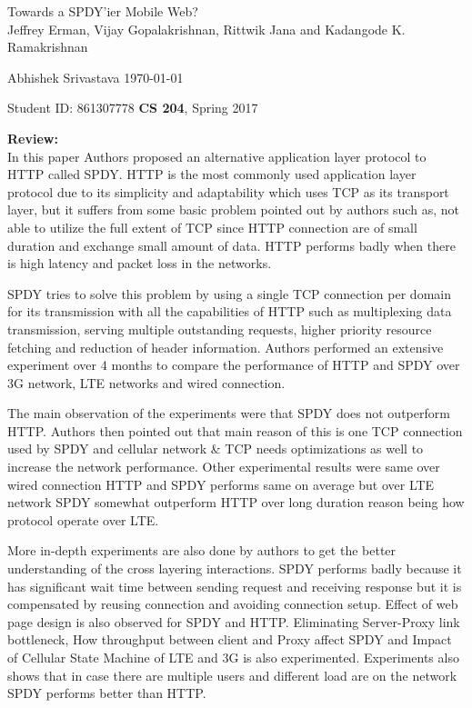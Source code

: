 \documentclass[a4paper,12pt, twoside]{article}
\renewcommand{\maketitle}{%
 	\Large
 	\begin{center}
 	Towards a SPDY'ier Mobile Web?\\	
 	\normalsize Jeffrey Erman, Vijay Gopalakrishnan,  Rittwik Jana and Kadangode K. Ramakrishnan
 	\end{center}
 
 	\Large
	Abhishek Srivastava
	\hfill
	\normalsize
	\today
 	\par
 	Student ID: 861307778
 	\hfill
 	\textbf{CS 204}, Spring 2017
 	\par 	
 	\hrulefill
 	\par
 	}
\begin{document}
\thispagestyle{empty}
	
\maketitle

\textbf{Review:}\\

In this paper Authors proposed an alternative application layer protocol to HTTP called SPDY. HTTP is the most commonly used application layer protocol due to its simplicity and adaptability which uses TCP as its transport layer, but it suffers from some basic problem pointed out by authors such as, not able to utilize the full extent of TCP since HTTP connection are of small duration and exchange small amount of data. HTTP performs badly when there is high latency and packet loss in the networks. 

SPDY tries to solve this problem by using a single TCP connection per domain for its transmission with all the capabilities of HTTP such as multiplexing data transmission, serving multiple outstanding requests, higher priority resource fetching and reduction of header information. Authors performed an extensive experiment over 4 months to compare the performance of HTTP and SPDY over 3G network, LTE networks and wired connection. 

The main observation of the experiments were that SPDY does not outperform HTTP. Authors then pointed out that main reason of this is one TCP connection used by SPDY and cellular network \& TCP needs optimizations as well to increase the network performance. Other experimental results were same over wired connection HTTP and SPDY performs same on average but over LTE network SPDY somewhat outperform HTTP over long duration reason being how protocol operate over LTE.

More in-depth experiments are also done by authors to get the better understanding of the cross layering interactions. SPDY performs badly because it has significant wait time between sending request and receiving response but it is compensated by reusing connection and avoiding connection setup. Effect of web page design is also observed for SPDY and HTTP. Eliminating Server-Proxy link bottleneck, How throughput between client and Proxy affect SPDY and Impact of Cellular State Machine of LTE and 3G is also experimented. Experiments also shows that in case there are multiple users and different load are on the network SPDY performs better than HTTP.     
\end{document}
